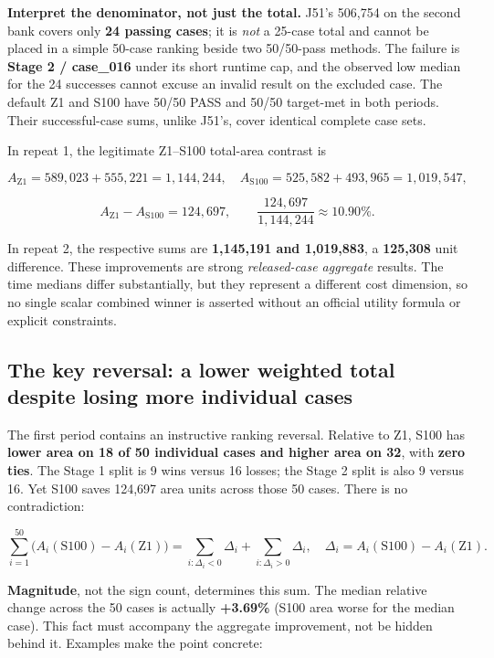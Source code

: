 \textbf{Interpret the denominator, not just the total.} J51's 506,754 on the second bank covers only \textbf{24 passing cases}; it is \emph{not} a 25-case total and cannot be placed in a simple 50-case ranking beside two 50/50-pass methods. The failure is \textbf{Stage 2 / case\_016} under its short runtime cap, and the observed low median for the 24 successes cannot excuse an invalid result on the excluded case. The default Z1 and S100 have 50/50 PASS and 50/50 target-met in both periods. Their successful-case sums, unlike J51's, cover identical complete case sets.

In repeat 1, the legitimate Z1--S100 total-area contrast is

\[
A_{\mathrm{Z1}}=589{,}023+555{,}221=1{,}144{,}244,
\quad A_{\mathrm{S100}}=525{,}582+493{,}965=1{,}019{,}547,
\]

\[
A_{\mathrm{Z1}}-A_{\mathrm{S100}}=124{,}697,
\qquad \frac{124{,}697}{1{,}144{,}244}\approx 10.90\%.
\]

In repeat 2, the respective sums are \textbf{1,145,191 and 1,019,883}, a \textbf{125,308} unit difference. These improvements are strong \emph{released-case aggregate} results. The time medians differ substantially, but they represent a different cost dimension, so no single scalar combined winner is asserted without an official utility formula or explicit constraints.

\subsection{The key reversal: a lower weighted total despite losing more individual cases}\label{the-key-reversal-a-lower-weighted-total-despite-losing-more-individual-cases}

The first period contains an instructive ranking reversal. Relative to Z1, S100 has \textbf{lower area on 18 of 50 individual cases and higher area on 32}, with \textbf{zero ties}. The Stage 1 split is 9 wins versus 16 losses; the Stage 2 split is also 9 versus 16. Yet S100 saves 124,697 area units across those 50 cases. There is no contradiction:

\[
\sum_{i=1}^{50}\bigl(A_i(\mathrm{S100})-A_i(\mathrm{Z1})\bigr)
= \sum_{i:\Delta_i<0}\Delta_i+\sum_{i:\Delta_i>0}\Delta_i,
\quad\Delta_i=A_i(\mathrm{S100})-A_i(\mathrm{Z1}).
\]

\textbf{Magnitude}, not the sign count, determines this sum. The median relative change across the 50 cases is actually \textbf{+3.69\%} (S100 area worse for the median case). This fact must accompany the aggregate improvement, not be hidden behind it. Examples make the point concrete:


